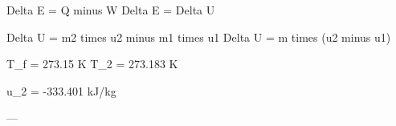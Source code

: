 Delta E = Q minus W  
Delta E = Delta U  

Delta U = m2 times u2 minus m1 times u1  
Delta U = m times (u2 minus u1)  

T_f = 273.15 K  
T_2 = 273.183 K  

u_2 = -333.401 kJ/kg  

---